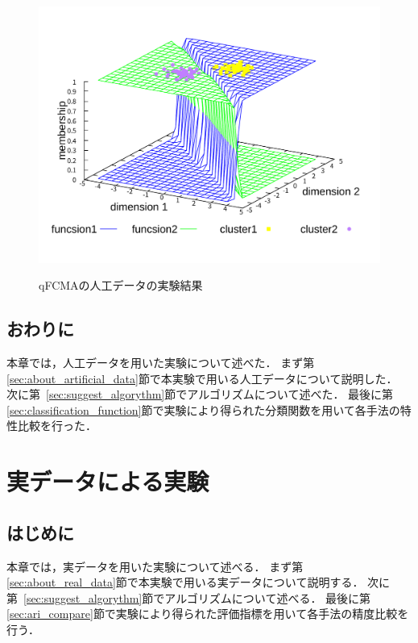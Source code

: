 \documentclass[a4j,12pt,dvipdfmx,oneside]{jsbook}
\theoremstyle{definition}
\begin{document}
\begin{figure}[htbp]
\begin{minipage}{0.43\hsize}
  \includegraphics[width=\linewidth]{qFCMA-Em11-Lambda10.pdf}
  \label{fig:qFCMA-Em11-Lambda10}
 \end{minipage}
 \vspace*{0.5cm}
 \caption{qFCMAの人工データの実験結果}
\end{figure}

 
 \section{おわりに}\label{sec:artificial_data_summary}
 本章では，人工データを用いた実験について述べた．
 まず第\ref{sec:about_artificial_data}節で本実験で用いる人工データについて説明した．
 次に第~\ref{sec:suggest_algorythm}節でアルゴリズムについて述べた．
 最後に第\ref{sec:classification_function}節で実験により得られた分類関数を用いて各手法の特性比較を行った．
 
 
 
\chapter{実データによる実験}\label{chap:real_data}

 \section{はじめに}\label{sec:real_data_intro}
 本章では，実データを用いた実験について述べる．
 まず第\ref{sec:about_real_data}節で本実験で用いる実データについて説明する．
 次に第~\ref{sec:suggest_algorythm}節でアルゴリズムについて述べる．
 最後に第\ref{sec:ari_compare}節で実験により得られた評価指標を用いて各手法の精度比較を行う．
 
\end{document}
